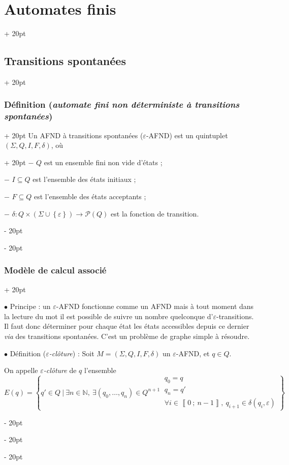 \documentclass[a4paper, 12pt, twoside]{article}
\newcommand{\N}{\mathbb{N}} %
\newcommand{\nset}[2]{\left\llbracket #1\ ;\ #2 \right\rrbracket}
\newcommand{\set}[1]{\left\{ #1 \right\}}
\newcommand{\ind}[1][20pt]{\advance\leftskip + #1}
\newcommand{\deind}[1][20pt]{\advance\leftskip - #1}
\newenvironment{indt}[2][20pt]{#2 \par \ind[#1]}{\par \deind} %
\begin{document}
\begin{indt}{\section{Automates finis}}
\begin{indt}{\subsection{Transitions spontanées}}
\begin{indt}{\subsubsection{Définition (\textit{automate fini non déterministe à transitions spontanées})}}
\begin{indt}{Un AFND à transitions spontanées ($\varepsilon$-AFND) est un quintuplet $(\Sigma, Q, I, F, \delta)$, où}
                    $-$ $Q$ est un ensemble fini non vide d'états ;

                    $-$ $I \subseteq Q$ est l'ensemble des états initiaux ;

                    $-$ $F \subseteq Q$ est l'ensemble des états acceptants ;

                    $-$ $\delta : Q \times (\Sigma \cup \set \varepsilon) \longrightarrow \mathcal P(Q)$ est la fonction de transition.
                \end{indt}
            \end{indt}

            \vspace{12pt}
            
            \begin{indt}{\subsubsection{Modèle de calcul associé}}
                \label{2.3.3}

                $\bullet$ Principe : un $\varepsilon$-AFND fonctionne comme un AFND mais à tout moment dans la lecture du mot il est possible de suivre un nombre quelconque d'$\varepsilon$-transitions.
                Il faut donc déterminer pour chaque état les états accessibles depuis ce dernier \textit{via} des transitions spontanées.
                C'est un problème de graphe simple à résoudre.

                \vspace{12pt}
                
                $\bullet$ Définition (\textit{$\varepsilon$-clôture}) : Soit $M = (\Sigma, Q, I, F, \delta)$ un $\varepsilon$-AFND, et $q \in Q$.

                On appelle \textit{$\varepsilon$-clôture} de $q$ l'ensemble
                \[
                    E(q) = \set{
                        q' \in Q\ |\ \exists n \in \N,\ \exists (q_0, \ldots, q_n) \in Q^{n + 1}\
                        \begin{array}{|l}
                            q_0 = q
                            \\
                            q_n = q'
                            \\
                            \forall i \in \nset 0 {n - 1},\ q_{i + 1} \in \delta(q_i, \varepsilon)
                        \end{array}
                    }
                \]


\end{indt}
\end{indt}
\end{indt}
\end{document}

